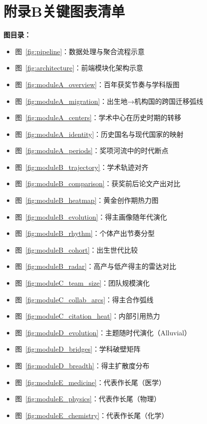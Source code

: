 \documentclass[UTF8]{CjC}
\theoremstyle{mystyle}
\begin{document}
{%


\section*{附录B\quad 关键图表清单}

\noindent \textbf{图目录：}
\begin{itemize}
    \item 图~\ref{fig:pipeline}：数据处理与聚合流程示意
    \item 图~\ref{fig:architecture}：前端模块化架构示意
    \item 图~\ref{fig:moduleA_overview}：百年获奖节奏与学科版图
    \item 图~\ref{fig:moduleA_migration}：出生地→机构国的跨国迁移弧线
    \item 图~\ref{fig:moduleA_centers}：学术中心在历史时期的转移
    \item 图~\ref{fig:moduleA_identity}：历史国名与现代国家的映射
    \item 图~\ref{fig:moduleA_periods}：奖项河流中的时代断点
    \item 图~\ref{fig:moduleB_trajectory}：学术轨迹对齐
    \item 图~\ref{fig:moduleB_comparison}：获奖前后论文产出对比
    \item 图~\ref{fig:moduleB_heatmap}：黄金创作期热力图
    \item 图~\ref{fig:moduleB_evolution}：得主画像随年代演化
    \item 图~\ref{fig:moduleB_rhythm}：个体产出节奏分型
    \item 图~\ref{fig:moduleB_cohort}：出生世代比较
    \item 图~\ref{fig:moduleB_radar}：高产与低产得主的雷达对比
    \item 图~\ref{fig:moduleC_team_size}：团队规模演化
    \item 图~\ref{fig:moduleC_collab_arcs}：得主合作弧线
    \item 图~\ref{fig:moduleC_citation_heat}：内部引用热力
    \item 图~\ref{fig:moduleD_evolution}：主题随时代演化（Alluvial）
    \item 图~\ref{fig:moduleD_bridges}：学科破壁矩阵
    \item 图~\ref{fig:moduleD_breadth}：得主扩散度分布
    \item 图~\ref{fig:moduleE_medicine}：代表作长尾（医学）
    \item 图~\ref{fig:moduleE_physics}：代表作长尾（物理）
    \item 图~\ref{fig:moduleE_chemistry}：代表作长尾（化学）
\end{itemize}

}
\end{document}
